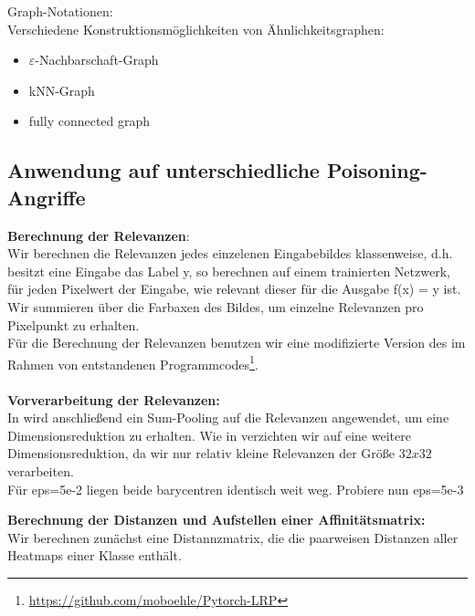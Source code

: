 \documentclass[twoside, 11pt,a4paper]{article}
\numberwithin{equation}{section}
\begin{document}
	
	Graph-Notationen:\\
	
	Verschiedene Konstruktionsmöglichkeiten von Ähnlichkeitsgraphen:
	
	\begin{itemize}
		\item $\varepsilon$-Nachbarschaft-Graph\\
		\item kNN-Graph\\
		\item fully connected graph
	\end{itemize}
	
	
	\subsection{Anwendung auf unterschiedliche Poisoning-Angriffe} \label{chapter_results} \label{chapter_experiments}
	\noindent \textbf{Berechnung der Relevanzen}:\\
	
	\noindent Wir berechnen die Relevanzen jedes einzelenen Eingabebildes klassenweise, d.h. besitzt eine Eingabe das Label y, so berechnen auf einem trainierten Netzwerk, für jeden Pixelwert der Eingabe, wie relevant dieser für die Ausgabe f(x) = y ist.\\
	Wir summieren über die Farbaxen des Bildes, um einzelne Relevanzen pro Pixelpunkt zu erhalten.\\
	Für die Berechnung der Relevanzen benutzen wir eine modifizierte Version des im Rahmen von \cite{lrp_alzheimer} entstandenen Programmcodes\footnote{\url{https://github.com/moboehle/Pytorch-LRP}}.\\
	\\
	\noindent \textbf{Vorverarbeitung der Relevanzen:}\\
	In \cite{unmaskingCH} wird anschließend ein Sum-Pooling auf die Relevanzen angewendet, um eine Dimensionsreduktion zu erhalten. Wie in \cite{imagenet_unhansed_v1} verzichten wir auf eine weitere Dimensionsreduktion, da wir nur relativ kleine Relevanzen der Größe $32x32$ verarbeiten.	\\
	
	Für eps=5e-2 liegen beide barycentren identisch weit weg. Probiere nun eps=5e-3
	
	\noindent \textbf{Berechnung der Distanzen und Aufstellen einer Affinitätsmatrix:}\\
	
	Wir berechnen zunächst eine Distannzmatrix, die die paarweisen Distanzen aller Heatmaps einer Klasse enthält.	
	
\end{document}

